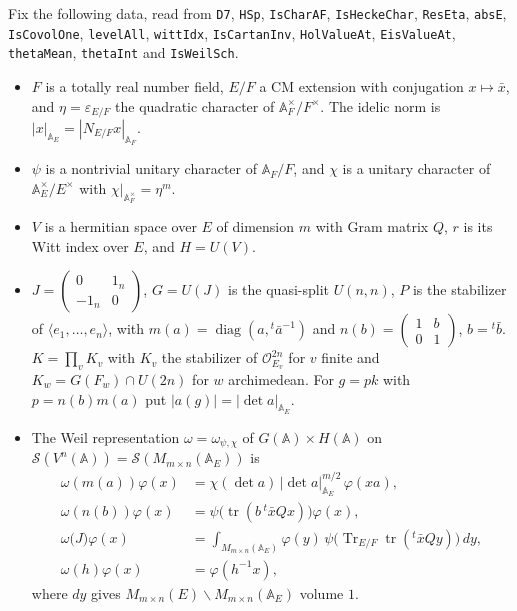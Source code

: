 \documentclass[11pt]{article}
\newcommand{\lean}[1]{\nolinkurl{#1}}
\theoremstyle{definition}
\begin{document}
Fix the following data, read from \lean{D7}, \lean{HSp}, \lean{IsCharAF}, \lean{IsHeckeChar}, \lean{ResEta}, \lean{absE}, \lean{IsCovolOne}, \lean{levelAll}, \lean{wittIdx}, \lean{IsCartanInv}, \lean{HolValueAt}, \lean{EisValueAt}, \lean{thetaMean}, \lean{thetaInt} and \lean{IsWeilSch}.
\begin{itemize}[leftmargin=*]
\item $F$ is a totally real number field, $E/F$ a CM extension with conjugation $x\mapsto\bar x$, and $\eta=\varepsilon_{E/F}$ the quadratic character of $\mathbb A_F^\times/F^\times$. The idelic norm is $|x|_{\mathbb A_E}=|N_{E/F}x|_{\mathbb A_F}$.
\item $\psi$ is a nontrivial unitary character of $\mathbb A_F/F$, and $\chi$ is a unitary character of $\mathbb A_E^\times/E^\times$ with $\chi|_{\mathbb A_F^\times}=\eta^m$.
\item $V$ is a hermitian space over $E$ of dimension $m$ with Gram matrix $Q$, $r$ is its Witt index over $E$, and $H=U(V)$.
\item $J=\begin{pmatrix}0&1_n\\-1_n&0\end{pmatrix}$, $G=U(J)$ is the quasi-split $U(n,n)$, $P$ is the stabilizer of $\langle e_1,\dots,e_n\rangle$, with $m(a)=\operatorname{diag}(a,{}^t\bar a^{-1})$ and $n(b)=\begin{pmatrix}1&b\\0&1\end{pmatrix}$, $b={}^t\bar b$. $K=\prod_vK_v$ with $K_v$ the stabilizer of $\mathcal O_{E_v}^{2n}$ for $v$ finite and $K_w=G(F_w)\cap U(2n)$ for $w$ archimedean. For $g=pk$ with $p=n(b)m(a)$ put $|a(g)|=|\det a|_{\mathbb A_E}$.
\item The Weil representation $\omega=\omega_{\psi,\chi}$ of $G(\mathbb A)\times H(\mathbb A)$ on $\mathcal S(V^n(\mathbb A))=\mathcal S(M_{m\times n}(\mathbb A_E))$ is
\begin{align*}
\omega(m(a))\varphi(x)&=\chi(\det a)\,|\det a|_{\mathbb A_E}^{m/2}\,\varphi(xa),\\
\omega(n(b))\varphi(x)&=\psi\bigl(\operatorname{tr}(b\,{}^t\bar xQx)\bigr)\varphi(x),\\
\omega\bigl(J\bigr)\varphi(x)&=\int_{M_{m\times n}(\mathbb A_E)}\varphi(y)\,\psi\bigl(\operatorname{Tr}_{E/F}\operatorname{tr}({}^t\bar xQy)\bigr)\,dy,\\
\omega(h)\varphi(x)&=\varphi(h^{-1}x),
\end{align*}
where $dy$ gives $M_{m\times n}(E)\backslash M_{m\times n}(\mathbb A_E)$ volume $1$.

\end{itemize}
\end{document}
